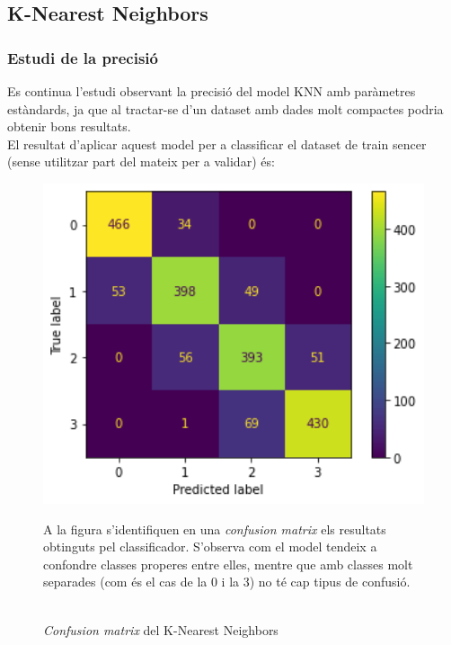 \documentclass[a4paper, 11pt]{article}
\begin{document}
\subsection{K-Nearest Neighbors}\label{KNN}
\subsubsection{Estudi de la precisió}
Es continua l'estudi observant la precisió del model KNN amb paràmetres estàndards, ja que al tractar-se d'un dataset amb dades molt compactes podria obtenir bons resultats.\\
El resultat d'aplicar aquest model per a classificar el dataset de train sencer (sense utilitzar part del mateix per a validar) és:
\begin{figure}[h] %
\begin{minipage}{7cm} %
\begin{center}
    \includegraphics[width=1\textwidth]{ConfMatrix/confusionmatrix_KNN.png}
    \caption{\textit{Confusion matrix} del K-Nearest Neighbors}
\end{center}
\end{minipage} %
\hspace{2em}
\begin{minipage}{7cm} %
A la figura s'identifiquen en una \textit{confusion matrix} els resultats obtinguts pel classificador. S'observa com el model tendeix a confondre classes properes entre elles, mentre que amb classes molt separades (com és el cas de la 0 i la 3) no té cap tipus de confusió.\\\\

\end{minipage}
\end{figure}
\end{document}

